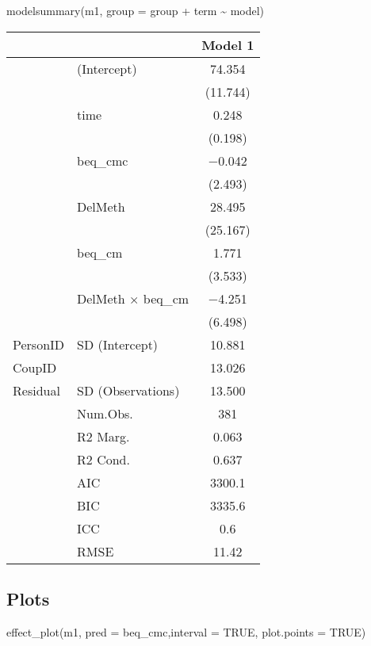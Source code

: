 \documentclass[
]{article}
\newenvironment{Shaded}{\begin{snugshade}}{\end{snugshade}}
\newcommand{\AttributeTok}[1]{\textcolor[rgb]{0.77,0.63,0.00}{#1}}
\newcommand{\ConstantTok}[1]{\textcolor[rgb]{0.00,0.00,0.00}{#1}}
\newcommand{\FunctionTok}[1]{\textcolor[rgb]{0.00,0.00,0.00}{#1}}
\newcommand{\NormalTok}[1]{#1}
\newcommand{\SpecialCharTok}[1]{\textcolor[rgb]{0.00,0.00,0.00}{#1}}
\begin{document}
\begin{Shaded}
\begin{Highlighting}[]
\FunctionTok{modelsummary}\NormalTok{(m1, }\AttributeTok{group =}\NormalTok{ group }\SpecialCharTok{+}\NormalTok{ term }\SpecialCharTok{\textasciitilde{}}\NormalTok{ model)}
\end{Highlighting}
\end{Shaded}

\begin{table}
\centering
\begin{tabular}[t]{llc}
\toprule
  &    & Model 1\\
\midrule
 & (Intercept) & \num{74.354}\\
 &  & (\num{11.744})\\
 & time & \num{0.248}\\
 &  & (\num{0.198})\\
 & beq\_cmc & \num{-0.042}\\
 &  & (\num{2.493})\\
 & DelMeth & \num{28.495}\\
 &  & (\num{25.167})\\
 & beq\_cm & \num{1.771}\\
 &  & (\num{3.533})\\
 & DelMeth × beq\_cm & \num{-4.251}\\
 &  & (\num{6.498})\\
PersonID & SD (Intercept) & \num{10.881}\\
CoupID &  & \num{13.026}\\
Residual & SD (Observations) & \num{13.500}\\
 & Num.Obs. & \num{381}\\
 & R2 Marg. & \num{0.063}\\
 & R2 Cond. & \num{0.637}\\
\midrule
 & AIC & \num{3300.1}\\
 & BIC & \num{3335.6}\\
 & ICC & \num{0.6}\\
 & RMSE & \num{11.42}\\
\bottomrule
\end{tabular}
\end{table}

\hypertarget{plots}{%
\subsection{Plots}\label{plots}}

\begin{Shaded}
\begin{Highlighting}[]
\FunctionTok{effect\_plot}\NormalTok{(m1, }\AttributeTok{pred =}\NormalTok{ beq\_cmc,}\AttributeTok{interval =} \ConstantTok{TRUE}\NormalTok{, }\AttributeTok{plot.points =} \ConstantTok{TRUE}\NormalTok{)}
\end{Highlighting}
\end{Shaded}
\end{document}
